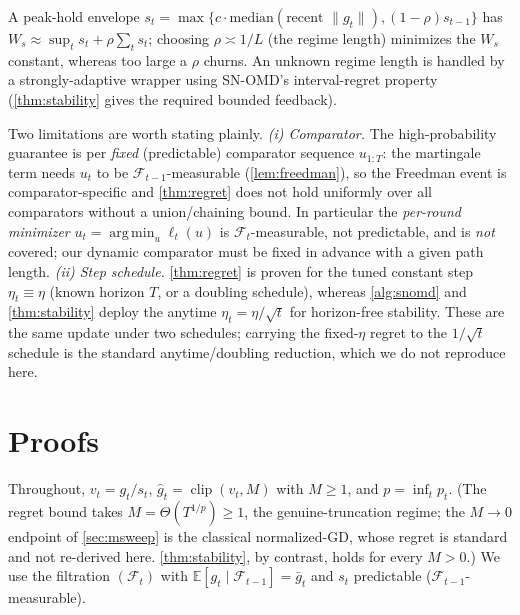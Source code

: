 \documentclass{article}
\newcommand{\E}{\mathbb{E}}
\newcommand{\norm}[1]{\lVert #1 \rVert}
\newcommand{\gt}{g_t}
\newcommand{\clip}{\operatorname{clip}}
\DeclareMathOperator*{\argmin}{arg\,min}
\begin{document}
\begin{remark}
\label{rmk:tracker}
A peak-hold envelope $s_t=\max\{c\cdot\mathrm{median}(\text{recent }\norm{\gt}),(1-\rho)s_{t-1}\}$
has $W_s\approx\sup_t s_t+\rho\sum_t s_t$; choosing $\rho\asymp1/L$ (the regime length)
minimizes the $W_s$ constant, whereas too large a $\rho$ churns. An unknown regime length
is handled by a strongly-adaptive wrapper \citep{daniely2015,cutkosky2020} using SN-OMD's
interval-regret property (\cref{thm:stability} gives the required bounded feedback).
\end{remark}

\begin{remark}
\label{rmk:scope}
Two limitations are worth stating plainly. \emph{(i) Comparator.} The high-probability
guarantee is per \emph{fixed} (predictable) comparator sequence $u_{1:T}$: the martingale
term needs $u_t$ to be $\mathcal F_{t-1}$-measurable (\cref{lem:freedman}), so the Freedman
event is comparator-specific and \cref{thm:regret} does not hold uniformly over all
comparators without a union/chaining bound. In particular the \emph{per-round minimizer}
$u_t=\argmin_u\ell_t(u)$ is $\mathcal F_t$-measurable, not predictable, and is \emph{not}
covered; our dynamic comparator must be fixed in advance with a given path length. \emph{(ii)
Step schedule.} \cref{thm:regret} is proven for the tuned constant step $\eta_t\equiv\eta$
(known horizon $T$, or a doubling schedule), whereas \cref{alg:snomd} and \cref{thm:stability}
deploy the anytime $\eta_t=\eta/\sqrt t$ for horizon-free stability. These are the same update
under two schedules; carrying the fixed-$\eta$ regret to the $1/\sqrt t$ schedule is the
standard anytime/doubling reduction, which we do not reproduce here.
\end{remark}

\section{Proofs}
\label{app:proofs}

Throughout, $v_t=\gt/s_t$, $\hat g_t=\clip(v_t,M)$ with $M\ge1$, and $p=\inf_t p_t$. (The
regret bound takes $M=\Theta(T^{1/p})\ge1$, the genuine-truncation regime; the $M\!\to\!0$
endpoint of \cref{sec:msweep} is the classical normalized-GD, whose regret is standard and
not re-derived here. \cref{thm:stability}, by contrast, holds for every $M>0$.)
We use the filtration $(\mathcal F_t)$ with $\E[\gt\mid\mathcal F_{t-1}]=\bar g_t$ and
$s_t$ predictable ($\mathcal F_{t-1}$-measurable).
\end{document}
